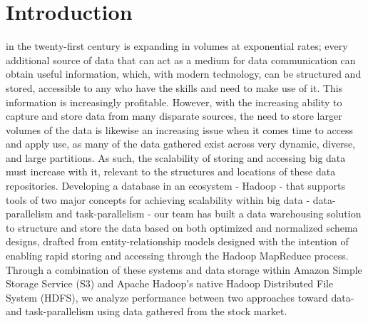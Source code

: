 \documentclass[journal]{IEEEtran}
\begin{document}
%
\IEEEpeerreviewmaketitle



\section{Introduction}
% 
% 
% 
% 
 in the twenty-first century is expanding in volumes at exponential rates; every additional source of data that can act as a medium for data communication can obtain useful information, which, with modern technology, can be structured and stored, accessible to any who have the skills and need to make use of it. This information is increasingly profitable. However, with the increasing ability to capture and store data from many disparate sources, the need to store larger volumes of the data is likewise an increasing issue when it comes time to access and apply use, as many of the data gathered exist across very dynamic, diverse, and large partitions. As such, the scalability of storing and accessing big data must increase with it, relevant to the structures and locations of these data repositories. Developing a database in an ecosystem - Hadoop - that supports tools of two major concepts for achieving scalability within big data - data-parallelism and task-parallelism - our team has built a data warehousing solution to structure and store the data based on both optimized and normalized schema designs, drafted from entity-relationship models designed with the intention of enabling rapid storing and accessing through the Hadoop MapReduce process. Through a combination of these systems and data storage within Amazon Simple Storage Service (S3) and Apache Hadoop's native Hadoop Distributed File System (HDFS), we analyze performance between two approaches toward data- and task-parallelism using data gathered from the stock market.
\end{document}
